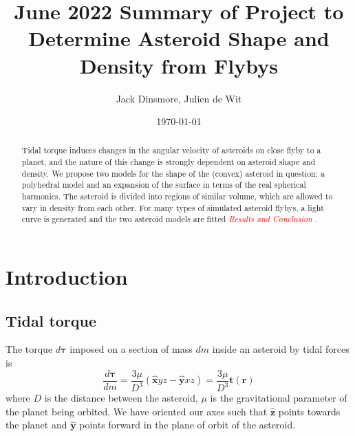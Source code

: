 \documentclass[aps,twocolumn,secnumarabic,balancelastpage,amsmath,amssymb,nofootinbib,floatfix]{revtex4-1}
\begin{document}
\title{June 2022 Summary of Project to Determine Asteroid Shape and Density from Flybys}
\author{Jack Dinsmore, Julien de Wit}
\date{\today}

\newcommand{\parens}[1]{\left( #1 \right)}
\newcommand{\brackets}[1]{\left[ #1 \right]}
\newcommand{\comment}[1]{\textcolor{red}{\emph{ #1 }}}






\begin{abstract}
    Tidal torque induces changes in the angular velocity of asteroids on close flyby to a planet, and the nature of this change is strongly dependent on asteroid shape and density. We propose two models for the shape of the (convex) asteroid in question: a polyhedral model and an expansion of the surface in terms of the real spherical harmonics. The asteroid is divided into regions of similar volume, which are allowed to vary in density from each other. For many types of simulated asteroid flybys, a light curve is generated and the two asteroid models are fitted \comment{Results and Conclusion}.
\end{abstract}

\maketitle



\section{Introduction}
\subsection{Tidal torque}
The torque $d\bm{\tau}$ imposed on a section of mass $dm$ inside an asteroid by tidal forces is
\begin{equation}
    \frac{d\bm{\tau}}{dm} =\frac{3\mu}{D^3} (\bm{\hat x} yz - \bm{\hat y} xz) = \frac{3\mu}{D^3} \bm{t}(\bm{r})
    \label{eqn:diff-torque}
\end{equation}
where $D$ is the distance between the asteroid, $\mu$ is the gravitational parameter of the planet being orbited. We have oriented our axes such that $\hat {\bm z}$ points towards the planet and $\hat {\bm y}$ points forward in the plane of orbit of the asteroid.
\end{document}
